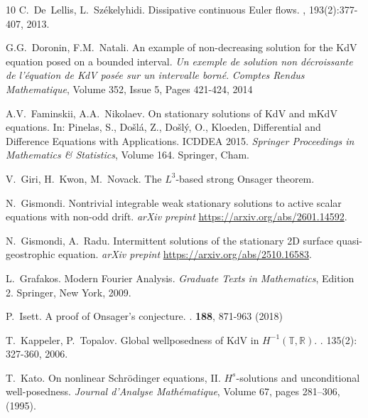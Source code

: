 \documentclass[12pt,reqno,letterpaper]{amsart}
\numberwithin{equation}{section}
\newcommand{\1}{{\bf 1}}
\newcommand{\2}{{\bf 2}}
\newcommand{\R}{\mathbb R}
\newcommand{\T}{\mathbb T}
\theoremstyle{remark}
\theoremstyle{remark}
\begin{document}
\begin{thebibliography}{10}
    C.~De~Lellis, L.~Sz{{\'e}}kelyhidi.
    \newblock Dissipative continuous {E}uler flows.
    , 193(2):377-407, 2013.

    G.G.~Doronin, F.M.~Natali.
    \newblock An example of non-decreasing solution for the KdV equation posed on a bounded interval. {\em Un exemple de solution non d\'{e}croissante de l’\'{e}quation de KdV pos\'{e}e sur un intervalle born\'{e}}.
    \newblock \emph{Comptes Rendus Mathematique}, Volume 352, Issue 5, Pages 421-424, 2014

    A.V.~Faminskii, A.A.~Nikolaev.
    \newblock On stationary solutions of KdV and mKdV
    equations.
    \newblock  In: Pinelas, S., Do\v{s}l\'{a}, Z., Do\v{s}l\'{y}, O., Kloeden, Differential and Difference Equations with Applications. ICDDEA 2015.
    \newblock\emph{Springer Proceedings in Mathematics \& Statistics}, Volume 164. Springer, Cham.

    V.~Giri, H.~Kwon, M.~Novack.
    \newblock The $L^3$-based strong Onsager theorem.

    N.~Gismondi.
    \newblock Nontrivial integrable weak stationary solutions to active scalar equations with non-odd drift.
    \newblock \emph{arXiv prepint} \url{https://arxiv.org/abs/2601.14592}.

    N.~Gismondi, A.~Radu.
    \newblock Intermittent solutions of the stationary 2D surface quasi-geostrophic equation.
    \newblock \emph{arXiv prepint} \url{https://arxiv.org/abs/2510.16583}.


    L.~Grafakos.
    \newblock Modern Fourier Analysis.
    \newblock \emph{Graduate Texts in Mathematics}, Edition 2.  Springer, New York, 2009.

    P.~Isett.
    \newblock A proof of Onsager's conjecture. . \textbf{188}, 871-963 (2018)

    T.~Kappeler, P.~Topalov.
    \newblock Global wellposedness of KdV in $H^{-1}(\T,\R)$.
    . 135(2): 327-360, 2006.

    T.~Kato.
    \newblock On nonlinear Schr\"{o}dinger equations, II. $H^s$-solutions and unconditional well-posedness.
    \newblock \emph{Journal d’Analyse Math\'{e}matique}, Volume 67, pages 281–306, (1995).
    

\end{thebibliography}
\end{document}
